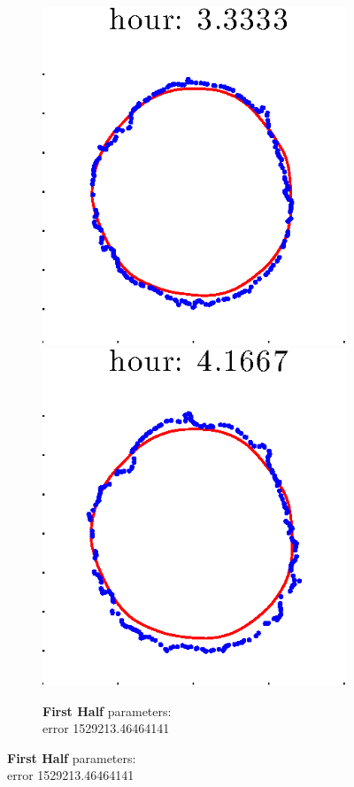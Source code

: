 \documentclass[12pt]{article}
\begin{document}
\begin{figure}[h!]
\begin{subfigure}[b]{.3\textwidth}
		\includegraphics[height=.15\textheight]{Pos0/secondhalf/first5.eps}
		\includegraphics[height=.15\textheight]{Pos0/secondhalf/first6.eps}
		\caption{\textbf{First Half} parameters: \\error 1529213.46464141}

\end{subfigure}
\end{figure}
\end{document}
